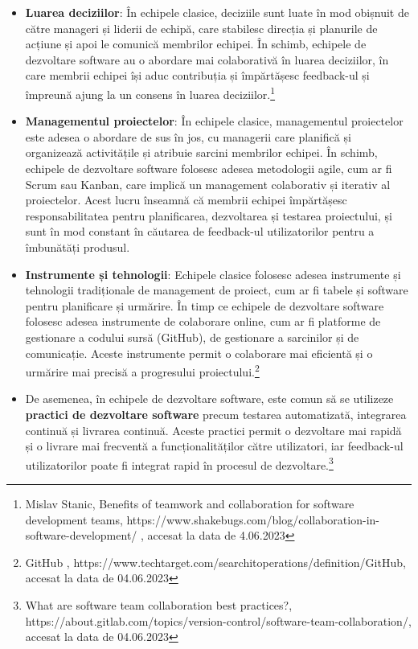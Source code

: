 \documentclass[a4paper, 12pt]{article}
\begin{document}
\begin {itemize}

	\item \textbf{Luarea deciziilor}: În echipele clasice, deciziile sunt luate în mod obișnuit de către manageri și liderii de echipă, care stabilesc direcția și planurile de acțiune și apoi le comunică membrilor echipei. În schimb, echipele de dezvoltare software au o abordare mai colaborativă în luarea deciziilor, în care membrii echipei își aduc contribuția și împărtășesc feedback-ul și împreună ajung la un consens în luarea deciziilor.\footnote{Mislav Stanic, Benefits of teamwork and collaboration for software development teams, https://www.shakebugs.com/blog/collaboration-in-software-development/ , accesat la data de 4.06.2023}

	\item\textbf{Managementul proiectelor}: În echipele clasice, managementul proiectelor este adesea o abordare de sus în jos, cu managerii care planifică și organizează activitățile și atribuie sarcini membrilor echipei. În schimb, echipele de dezvoltare software folosesc adesea metodologii agile, cum ar fi Scrum sau Kanban, care implică un management colaborativ și iterativ al proiectelor. Acest lucru înseamnă că membrii echipei împărtășesc responsabilitatea pentru planificarea, dezvoltarea și testarea proiectului, și sunt în mod constant în căutarea de feedback-ul utilizatorilor pentru a îmbunătăți produsul.

	\item \textbf{ Instrumente și tehnologii}: Echipele clasice folosesc adesea instrumente și tehnologii tradiționale de management de proiect, cum ar fi tabele și software pentru planificare și urmărire. În timp ce echipele de dezvoltare software folosesc adesea instrumente de colaborare online, cum ar fi platforme de gestionare a codului sursă (GitHub), de gestionare a sarcinilor și de comunicație. Aceste instrumente permit o colaborare mai eficientă și o urmărire mai precisă a progresului proiectului.\footnote{GitHub , https://www.techtarget.com/searchitoperations/definition/GitHub, accesat la data de 04.06.2023}

	\item De asemenea, în echipele de dezvoltare software, este comun să se utilizeze \textbf{practici de dezvoltare software} precum testarea automatizată, integrarea continuă și livrarea continuă. Aceste practici permit o dezvoltare mai rapidă și o livrare mai frecventă a funcționalităților către utilizatori, iar feedback-ul utilizatorilor poate fi integrat rapid în procesul de dezvoltare.\footnote{What are software team collaboration best practices?, https://about.gitlab.com/topics/version-control/software-team-collaboration/, accesat la data de 04.06.2023}


\end{itemize}
\end{document}
